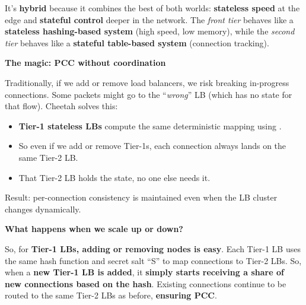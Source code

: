 It's \textbf{hybrid} because it combines the best of both worlds: \textbf{stateless speed} at the edge and \textbf{stateful control} deeper in the network. The \emph{front tier} behaves like a \textbf{stateless hashing-based system} (high speed, low memory), while the \emph{second tier} behaves like a \textbf{stateful table-based system} (connection tracking).

\highspace
\begin{flushleft}
    \textcolor{Green3}{ \textbf{The magic: PCC without coordination}}
\end{flushleft}
Traditionally, if we add or remove load balancers, we risk breaking in-progress connections. Some packets might go to the ``\emph{wrong}'' LB (which has no state for that flow). Cheetah solves this:
\begin{itemize}
    \item \textbf{Tier-1 stateless LBs} compute the same deterministic mapping using .
    \item So even if we add or remove Tier-1s, each connection always lands on the same Tier-2 LB.
    \item That Tier-2 LB holds the state, no one else needs it.
\end{itemize}
Result: per-connection consistency is maintained even when the LB cluster changes dynamically.

\highspace
\begin{flushleft}
    \textcolor{Green3}{ \textbf{What happens when we scale up or down?}}
\end{flushleft}
So, for \textbf{Tier-1 LBs, adding or removing nodes is easy}. Each Tier-1 LB uses the same hash function and secret salt ``S'' to map connections to Tier-2 LBs. So, when a \textbf{new Tier-1 LB is added}, it \textbf{simply starts receiving a share of new connections based on the hash}. Existing connections continue to be routed to the same Tier-2 LBs as before, \textbf{ensuring PCC}.

